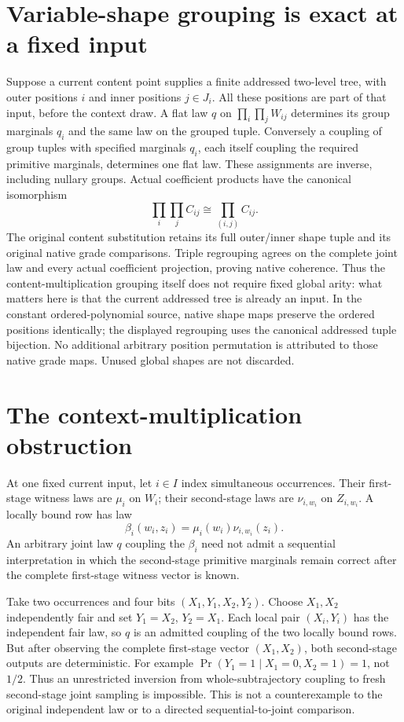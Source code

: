 \documentclass[11pt]{article}
\begin{document}
\section{Variable-shape grouping is exact at a fixed input}
Suppose a current content point supplies a finite addressed two-level tree, with outer positions $i$ and inner positions $j\in J_i$. All these positions are part of that input, before the context draw. A flat law $q$ on $\prod_i\prod_jW_{ij}$ determines its group marginals $q_i$ and the same law on the grouped tuple. Conversely a coupling of group tuples with specified marginals $q_i$, each itself coupling the required primitive marginals, determines one flat law. These assignments are inverse, including nullary groups. Actual coefficient products have the canonical isomorphism
\[
 \prod_i\prod_j C_{ij}\cong\prod_{(i,j)}C_{ij}.
\]
The original content substitution retains its full outer/inner shape tuple and its original native grade comparisons. Triple regrouping agrees on the complete joint law and every actual coefficient projection, proving native coherence. Thus the content-multiplication grouping itself does not require fixed global arity: what matters here is that the current addressed tree is already an input. In the constant ordered-polynomial source, native shape maps preserve the ordered positions identically; the displayed regrouping uses the canonical addressed tuple bijection. No additional arbitrary position permutation is attributed to those native grade maps. Unused global shapes are not discarded.

\section{The context-multiplication obstruction}
At one fixed current input, let $i\in I$ index simultaneous occurrences. Their first-stage witness laws are $\mu_i$ on $W_i$; their second-stage laws are $\nu_{i,w_i}$ on $Z_{i,w_i}$. A locally bound row has law
\[
 \beta_i(w_i,z_i)=\mu_i(w_i)\nu_{i,w_i}(z_i).
\]
An arbitrary joint law $q$ coupling the $\beta_i$ need not admit a sequential interpretation in which the second-stage primitive marginals remain correct after the complete first-stage witness vector is known.

Take two occurrences and four bits $(X_1,Y_1,X_2,Y_2)$. Choose $X_1,X_2$ independently fair and set $Y_1=X_2$, $Y_2=X_1$. Each local pair $(X_i,Y_i)$ has the independent fair law, so $q$ is an admitted coupling of the two locally bound rows. But after observing the complete first-stage vector $(X_1,X_2)$, both second-stage outputs are deterministic. For example $\Pr(Y_1=1\mid X_1=0,X_2=1)=1$, not $1/2$. Thus an unrestricted inversion from whole-subtrajectory coupling to fresh second-stage joint sampling is impossible. This is not a counterexample to the original independent law or to a directed sequential-to-joint comparison.
\end{document}
